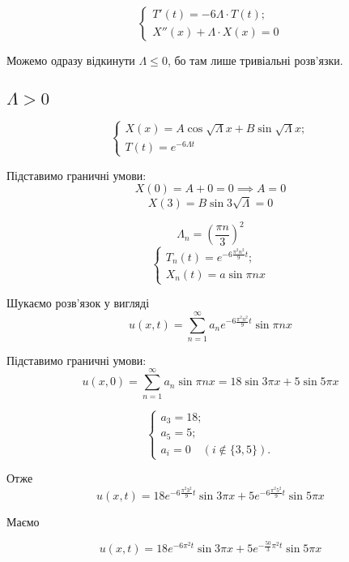 \documentclass[11pt, a4paper]{article} %
\begin{document}
\begin{equation}
    \begin{cases}
        T'(t) = -6\Lambda\cdot T(t);\\
        X''(x) + \Lambda \cdot X(x) = 0
    \end{cases}
\end{equation}

Можемо одразу відкинути $\Lambda \le 0$, бо там лише тривіальні розв'язки.

\subsection*{$\Lambda > 0$}

\begin{equation}
    \begin{cases}
        X(x) = A \cos \sqrt{\Lambda}x + B \sin \sqrt{\Lambda}x;\\
        T(t) = e^{-6\Lambda t}
    \end{cases}
\end{equation}

Підставимо граничні умови:
$$X(0) = A + 0 = 0 \implies A = 0$$
$$X(3) = B \sin 3\sqrt{\Lambda} = 0$$

\begin{equation}
    \Lambda_n = \left(\frac{\pi n}{3}\right)^2
\end{equation}
\begin{equation}
    \begin{cases}
        T_n(t) = e^{-6\frac{\pi^2 n^2}{9} t}; \\
        X_n(t) = a \sin \pi n x
    \end{cases}
\end{equation}

Шукаємо розв'язок у вигляді
$$u(x,t) = \sum_{n=1}^\infty a_n e^{-6\frac{\pi^2 n^2}{9} t} \sin \pi n x$$

Підставимо граничні умови:
$$u(x,0) = \sum_{n=1}^\infty a_n \sin \pi n x =18\sin 3\pi x + 5 \sin 5\pi x $$

\begin{equation}
    \begin{cases}
        a_3 = 18;\\
        a_5 = 5;\\
        a_i = 0 \quad (i \notin \{3,5\}).
    \end{cases}
\end{equation}

Отже
$$
    u(x,t) = 18 e^{-6\frac{\pi^2 3^2}{9} t} \sin 3\pi x + 5 e^{-6\frac{\pi^2 5^2}{9} t} \sin 5\pi x
$$

Маємо
\begin{mdframed}[style=ans]  
$$    
u(x,t) = 18 e^{-6\pi^2 t} \sin 3\pi x + 5 e^{-\frac{50}{3} \pi^2 t} \sin 5\pi x
$$
\end{mdframed}
\end{document}

